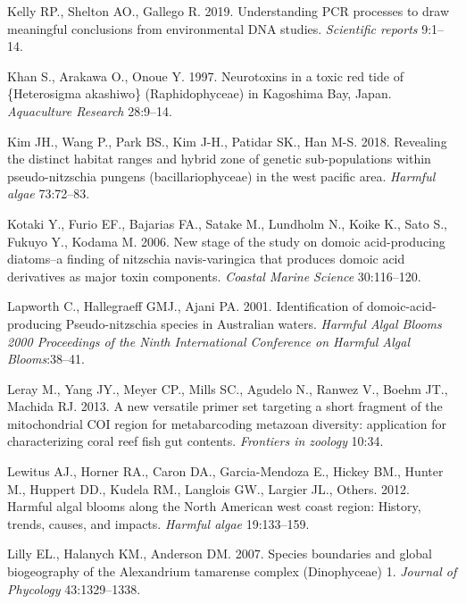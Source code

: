\documentclass[
]{article}
\begin{document}
\leavevmode\hypertarget{ref-kelly2019understanding}{}%
Kelly RP., Shelton AO., Gallego R. 2019. Understanding PCR processes to
draw meaningful conclusions from environmental DNA studies.
\emph{Scientific reports} 9:1--14.

\leavevmode\hypertarget{ref-khan1997neurotoxins}{}%
Khan S., Arakawa O., Onoue Y. 1997. Neurotoxins in a toxic red tide of
\{Heterosigma akashiwo\} (Raphidophyceae) in Kagoshima Bay, Japan.
\emph{Aquaculture Research} 28:9--14.

\leavevmode\hypertarget{ref-kim2018revealing}{}%
Kim JH., Wang P., Park BS., Kim J-H., Patidar SK., Han M-S. 2018.
Revealing the distinct habitat ranges and hybrid zone of genetic
sub-populations within pseudo-nitzschia pungens (bacillariophyceae) in
the west pacific area. \emph{Harmful algae} 73:72--83.

\leavevmode\hypertarget{ref-kotaki2006new}{}%
Kotaki Y., Furio EF., Bajarias FA., Satake M., Lundholm N., Koike K.,
Sato S., Fukuyo Y., Kodama M. 2006. New stage of the study on domoic
acid-producing diatoms--a finding of nitzschia navis-varingica that
produces domoic acid derivatives as major toxin components.
\emph{Coastal Marine Science} 30:116--120.

\leavevmode\hypertarget{ref-lapworth2001}{}%
Lapworth C., Hallegraeff GMJ., Ajani PA. 2001. Identification of
domoic-acid-producing Pseudo-nitzschia species in Australian waters.
\emph{Harmful Algal Blooms 2000 Proceedings of the Ninth International
Conference on Harmful Algal Blooms}:38--41.

\leavevmode\hypertarget{ref-leray2013new}{}%
Leray M., Yang JY., Meyer CP., Mills SC., Agudelo N., Ranwez V., Boehm
JT., Machida RJ. 2013. A new versatile primer set targeting a short
fragment of the mitochondrial COI region for metabarcoding metazoan
diversity: application for characterizing coral reef fish gut contents.
\emph{Frontiers in zoology} 10:34.

\leavevmode\hypertarget{ref-lewitus2012harmful}{}%
Lewitus AJ., Horner RA., Caron DA., Garcia-Mendoza E., Hickey BM.,
Hunter M., Huppert DD., Kudela RM., Langlois GW., Largier JL., Others.
2012. Harmful algal blooms along the North American west coast region:
History, trends, causes, and impacts. \emph{Harmful algae} 19:133--159.

\leavevmode\hypertarget{ref-lilly2007species}{}%
Lilly EL., Halanych KM., Anderson DM. 2007. Species boundaries and
global biogeography of the Alexandrium tamarense complex (Dinophyceae)
1. \emph{Journal of Phycology} 43:1329--1338.
\end{document}
